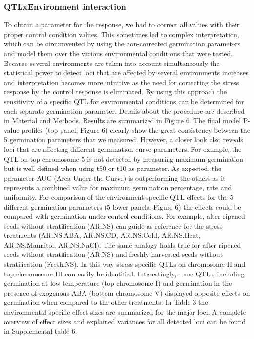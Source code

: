 \documentclass[8pt, twoside, a5paper]{report}
\begin{document}
\subsubsection{QTLxEnvironment interaction}
To obtain a parameter for the response, we had to correct all values with their proper control condition values. This sometimes led to complex interpretation, which can
be circumvented by using the non-corrected germination parameters and model them over the various environmental conditions that were tested. Because several
environments are taken into account simultaneously the statistical power to detect loci that are affected by several environments increases and interpretation becomes more
intuitive as the need for correcting the stress response by the control response is eliminated. By using this approach the sensitivity of a specific QTL for environmental
conditions can be determined for each separate germination parameter. Details about the procedure are described in Material and Methods. Results are summarized in Figure 6.
The final model P-value profiles (top panel, Figure 6) clearly show the great consistency between the 5 germination parameters that we measured. However, a closer look also
reveals loci that are affecting different germination curve parameters. For example, the QTL on top chromosome 5 is not detected by measuring maximum germination but is
well defined when using t50 or t10 as parameter. As expected, the parameter AUC (Area Under the Curve) is outperforming the others as it represents a combined value for
maximum germination percentage, rate and uniformity. For comparison of the environment-specific QTL effects for the 5 different germination parameters (5 lower
panels, Figure 6) the effects could be compared with germination under control conditions. For example, after ripened seeds without stratification (AR.NS) can guide as
reference for the stress treatments (AR.NS.ABA, AR.NS.CD, AR.NS.Cold, AR.NS.Heat, AR.NS.Mannitol, AR.NS.NaCl). The same analogy holds true for after ripened seeds
without stratification (AR.NS) and freshly harvested seeds without stratification (Fresh.NS). In this way stress specific QTLs on chromosome II and top chromosome III
can easily be identified. Interestingly, some QTLs, including germination at low temperature (top chromosome I) and germination in the presence of exogenous ABA
(bottom chromosome V) displayed opposite effects on germination when compared to the other treatments. In Table 3 the environmental specific effect sizes are summarized
for the major loci. A complete overview of effect sizes and explained variances for all detected loci can be found in Supplemental table 6. 
\end{document}
